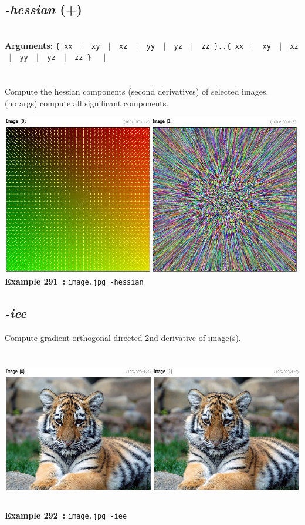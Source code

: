 \documentclass[a4paper,11pt,twoside]{book}
\begin{document}
\subsection{\emph{-hessian} (+)}\vspace*{-0.5em}
~\\\textbf{Arguments: } 
{\small \texttt{\{ xx ~$|$~ xy ~$|$~ xz ~$|$~ yy ~$|$~ yz ~$|$~ zz \}..\{ xx ~$|$~ xy ~$|$~ xz ~$|$~ yy ~$|$~ yz ~$|$~ zz \}}}~~~$|$\\
\\~\\
Compute the hessian components (second derivatives) of selected images.
~\\(no args) compute all significant components.
\begin{center}\includegraphics[keepaspectratio=true,height=7cm,width=\textwidth]{img/gmic_def291.jpg}\\
{\footnotesize \textbf{Example 291~:} \texttt{image.jpg -hessian}}
\end{center}

\subsection{\emph{-iee} }\vspace*{-0.5em}
Compute gradient-orthogonal-directed 2nd derivative of image(s).
\begin{center}\includegraphics[keepaspectratio=true,height=7cm,width=\textwidth]{img/gmic_def292.jpg}\\
{\footnotesize \textbf{Example 292~:} \texttt{image.jpg -iee}}
\end{center}
\end{document}
